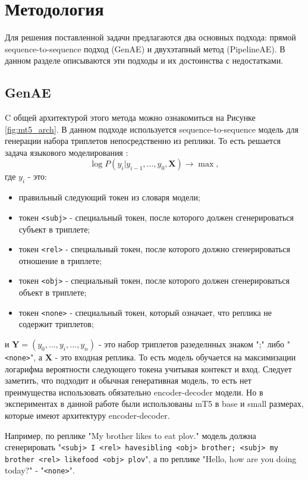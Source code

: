 \section{Методология}
Для решения поставленной задачи предлагаются два основных подхода: прямой sequence-to-sequence подход (GenAE) и двухэтапный метод (PipelineAE). В данном разделе описываются эти подходы и их достоинства с недостатками.

\subsection{GenAE}\label{sbs:direct_method}
C общей архитектурой этого метода можно ознакомиться на Рисунке \ref{fig:mt5_arch}. В данном подходе используется sequence-to-sequence модель для генерации набора триплетов непосредственно из реплики. То есть решается задача языкового моделирования \cite{bengio_nlm}:
\begin{equation}\label{lm_loss}
    \log P(y_i | y_{i-1}, ..., y_0, \mathbf{X}) \rightarrow \max,
\end{equation}
где $y_i$ - это:
\begin{itemize}
    \item правильный следующий токен из словаря модели;
    \item токен \texttt{<subj>} - специальный токен, после которого должен сгенерироваться субъект в триплете;
    \item токен \texttt{<rel>} - специальный токен, после которого должно сгенерироваться отношение в триплете;
    \item токен \texttt{<obj>} - специальный токен, после которого должен сгенерироваться объект в триплете;
    \item токен \texttt{<none>} - специальный токен, который означает, что реплика не содержит триплетов;
\end{itemize}
и $\mathbf{Y}=(y_0,...,y_i,...,y_n)$ - это набор триплетов разеделнных знаком ";" либо "\texttt{<none>}", а $\mathbf{X}$ - это входная реплика. То есть модель обучается на максимизации логарифма вероятности следующего токена учитывая контекст и вход. Следует заметить, что подходит и обычная генеративная модель, то есть нет преимущества использовать обязательно encoder-decoder модели. Но в экспериментах в данной работе были использованы mT5 в base и small размерах, которые имеют архитектуру encoder-decoder.

Например, по реплике "My brother likes to eat plov." модель должна сгенерировать "\texttt{<subj> I <rel> have\textunderscore sibling <obj> brother; <subj> my brother <rel> like\textunderscore food <obj> plov}", а по реплике "Hello, how are you doing today?" - "\texttt{<none>}".

